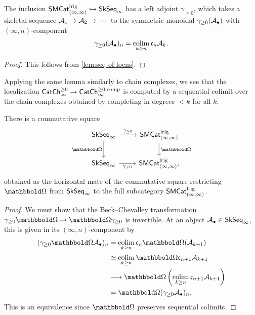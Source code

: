 \documentclass[a4paper,11pt]{article}
\begin{document}
\begin{propn}\label{propn:complete iicat}
  The inclusion $\SMCatII^{\lrig} \hookrightarrow \SkSeq_{\infty}$ has
  a left adjoint $\gamma_{\geq 0}$, which takes a skeletal sequence
  $\nA_{1} \to \nA_{2} \to \cdots$ to the symmetric monoidal \iicat{}
  $\gamma_{\geq 0}(\nA_{\bullet})$ with $(\infty,n)$-component
  \[ \gamma_{\geq 0}(\nA_{\bullet})_{n} = \colimP_{k \geq n} \core[n]\nA_{k}. \]
\end{propn}
\begin{proof}
 This follows from \cref{lem:seq of locns}.
\end{proof}

\begin{observation}
  Applying the same lemma similarly to chain complexes, we see that
  the localization $\CChp_{\infty} \to \CChpc_{\infty}$ is computed by
  a sequential colimit over the chain complexes obtained by completing
  in degrees $< k$ for all $k$.
\end{observation}

\begin{propn}
  There is a commutative square
  \[
    \begin{tikzcd}
     \SkSeqI \ar[r, "\gamma_{\geq 0}"] \ar[d, "\mOm"'] & \SMCatII^{\lrig}  \ar[d, "\mOm"] \\
     \SkSeqI \ar[r, "\gamma_{\geq 0}"'] & \SMCatII^{\lrig},
    \end{tikzcd}
  \]
  obtained as the horizontal mate of the commutative square
  restricting $\mOm$ from $\SkSeqI$ to the full subcategory $\SMCatII^{\lrig}$.
\end{propn}
\begin{proof}
  We must show that the Beck--Chevalley transformation $\gamma_{\geq 0} \mOm
  \to \mOm \gamma_{\geq 0}$ is invertible. At an object $\nA_{\bullet} \in \SkSeqI$,
  this is given in its $(\infty,n)$-component by
  \[
    \begin{split}
      (\gamma_{\geq 0} \mOm \nA_{\bullet})_{n}
      & = \colimP_{k \geq n} \core[n] \mOm(\nA_{k+1}) \\
      & \simeq \colimP_{k \geq n} \mOm \core[n+1] \nA_{k+1} \\
      & \longrightarrow \mOm \left(\colimP_{k \geq n}
        \core[n+1] \nA_{k+1}\right) \\
      & = \mOm(\gamma_{\geq 0}\nA_{\bullet})_{n}.
    \end{split}
  \]
  This is an equivalence since $\mOm$ preserves sequential colimits.
\end{proof}
\end{document}
